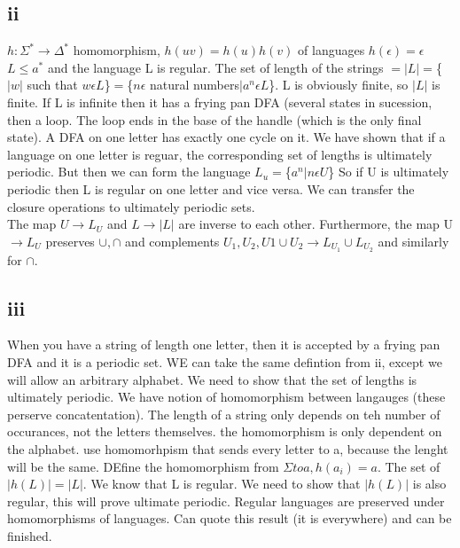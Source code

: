 \documentclass[12pt]{article}
\begin{document}
\subsection*{ii}
$h: \Sigma^\ast \rightarrow \Delta^\ast$ homomorphism, $h(uv) = h(u)h(v)$ of languages $h( \epsilon ) = \epsilon$ \\
$ L \le {a}^\ast$ and the language L is regular. The set of length of the strings $=|L|=$\{$|w|$ such that $w \epsilon L$\}$=$\{$n \epsilon $ natural numbers$ | a^n \epsilon L$\}. L is obviously finite, so $|L|$ is finite. If L is infinite then it has a frying pan DFA (several states in sucession, then a loop. 
The loop ends in the base of the handle (which is the only final state). A DFA on one letter has exactly one cycle on it. 
We have shown that if a language on one letter is reguar, the corresponding set of lengths is ultimately periodic. But then we can form the language $L_u = $\{$a^n | n \epsilon U$\}
So if U is ultimately periodic then L is regular on one letter and vice versa. We can transfer the closure operations to ultimately periodic sets.\\
The map $U \rightarrow L_U$ and $L \rightarrow |L|$ are inverse to each other.
Furthermore, the map U $\rightarrow L_U$ preserves $\cup , \cap$ and complements $U_1,U_2, U1 \cup U_2 \rightarrow L_{U_1} \cup L_{U_2}$ and similarly for $\cap$.

\subsection*{iii}
When you have a string of length one letter, then it is accepted by a frying pan DFA and it is a periodic set. 
WE can take the same defintion from ii, except we will allow an arbitrary alphabet. We need to show that the set of lengths is ultimately periodic. We have notion of homomorphism between langauges (these perserve concatentation). The length of a string only depends on teh number of occurances, not the letters themselves. the homomorphism is only dependent on the alphabet.
use homomorhpism that sends every letter to a, because the lenght will be the same. DEfine the homomorphism from $\Sigma to a, h(a_i) = a$. The set of $|h(L)| = |L|$. We know that L is regular. We need to show that $|h(L)|$ is also regular, this will prove ultimate periodic. Regular languages are preserved under homomorphisms of languages. Can quote this result (it is everywhere) and can be finished.
\end{document}
